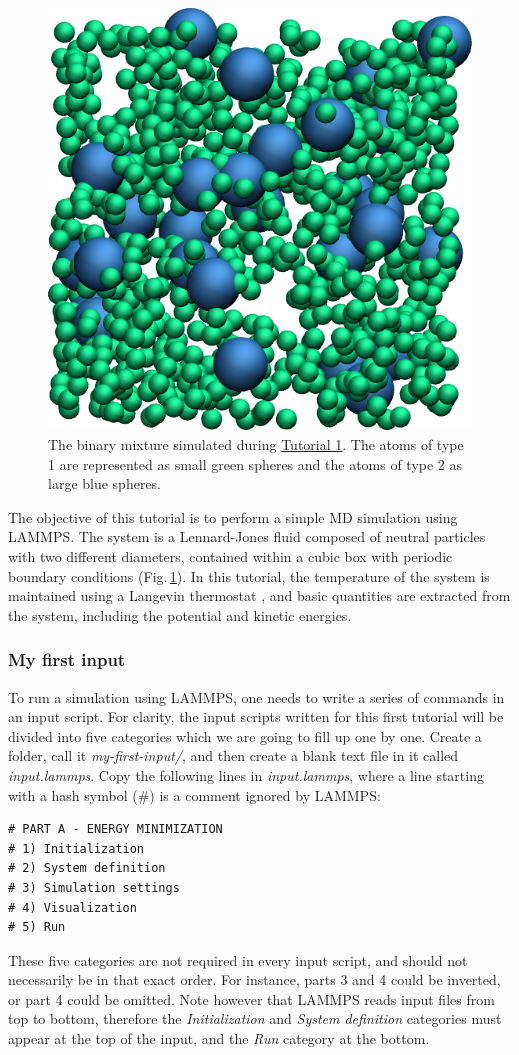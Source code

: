 \documentclass[9pt,tutorial]{livecoms}
\begin{document}
\begin{figure}
\centering
\includegraphics[width=0.55\linewidth]{LJ}
\caption{The binary mixture simulated during \hyperref[lennard-jones-label]{Tutorial 1}. The atoms of type 1 are represented as small green spheres and the atoms of type 2 as large blue spheres.}
\label{fig:LJ}
\end{figure}

\noindent The objective of this tutorial is to perform a simple MD simulation using LAMMPS. The system is a Lennard-Jones fluid composed of neutral particles with two different diameters, contained within a cubic box with periodic boundary conditions (Fig.\,\ref{fig:LJ}). In this tutorial, the temperature of the system is maintained using a Langevin thermostat \cite{schneider1978molecular}, and basic quantities are extracted from the system, including the potential and kinetic energies. 

\subsubsection{My first input}

\noindent To run a simulation using LAMMPS, one needs to write a series of commands in an input script. For clarity, the input scripts written for this first tutorial will be divided into five categories which we are going to fill up one by one. Create a folder, call it \textit{my-first-input/}, and then create a blank text file in it called \textit{input.lammps}. Copy the following lines in \textit{input.lammps}, where a line starting with a hash symbol ($\#$) is a comment ignored by LAMMPS:
{\normalsize \begin{verbatim}
# PART A - ENERGY MINIMIZATION
# 1) Initialization
# 2) System definition
# 3) Simulation settings
# 4) Visualization
# 5) Run
\end{verbatim}}
\noindent These five categories are not required in every input script, and should not necessarily be in that exact order. For instance, parts 3 and 4 could be inverted, or part 4 could be omitted. Note however that LAMMPS reads input files from top to bottom, therefore the \textit{Initialization} and \textit{System definition} categories must appear at the top of the input, and the \textit{Run} category at the bottom.
\end{document}
